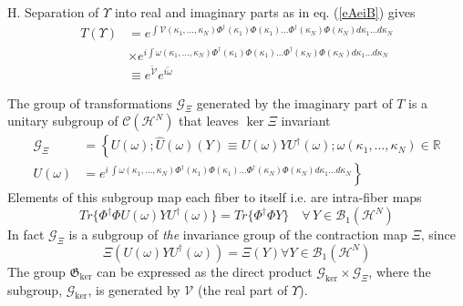 \documentclass[aps,preprint]{revtex4}%
\begin{document}
H. Separation of $\Upsilon$ into real and imaginary parts as in eq.
(\ref{eAeiB}) gives
\begin{align}
T(\Upsilon)  &  =e^{\int\mathcal{V}(\kappa_{1},\ldots,\kappa_{N})\Phi
^{\dagger}(\kappa_{1})\Phi(\kappa_{1})\ldots\Phi^{\dagger}(\kappa_{N}%
)\Phi(\kappa_{N})d\kappa_{1}\ldots d\kappa_{N}}\nonumber\\
&  \times e^{i\int\omega(\kappa_{1},\ldots,\kappa_{N})\Phi^{\dagger}%
(\kappa_{1})\Phi(\kappa_{1})\ldots\Phi^{\dagger}(\kappa_{N})\Phi(\kappa
_{N})d\kappa_{1}\ldots d\kappa_{N}}\nonumber\\
&  \equiv e^{\breve{\mathcal{V}}}e^{i\breve{\omega}} \label{TVomega}%
\end{align}


The group of transformations $\mathcal{G}_{\Xi}$ generated by the imaginary
part of $T$ is a unitary subgroup of $\mathcal{C}(\mathcal{H}^{N})$ that
leaves $\ker\Xi$ invariant
\begin{align}
\!\mathcal{G}_{\Xi}  &  =\left\{  U(\omega);\hat{U}(\omega)(Y)\equiv
U(\omega)YU^{\dagger}(\omega);\right.  \omega(\kappa_{1},\ldots,\kappa_{N}%
)\in\mathbb{R}\nonumber\\
U(\omega)  &  =\left.  e^{i\,\int\omega(\kappa_{1},\ldots,\kappa_{N}%
)\Phi^{\dagger}(\kappa_{1})\Phi(\kappa_{1})\ldots\Phi^{\dagger}(\kappa
_{N})\Phi(\kappa_{N})d\kappa_{1}\ldots d\kappa_{N}}\right\}  \label{GXidefn1}%
\end{align}
Elements of this subgroup map each fiber to itself i.e. are intra-fiber maps
\begin{equation}
Tr\{\Phi^{\dagger}\Phi U(\omega)YU^{\dagger}(\omega)\}=Tr\{\Phi^{\dagger}\Phi
Y\}\quad\forall\,Y\in\mathcal{B}_{1}(\mathcal{H}^{N})
\end{equation}
In fact $\mathcal{G}_{\Xi}$ is a subgroup of \emph{the} invariance group of
the contraction map $\Xi$, since
\begin{equation}
\Xi\left(  U(\omega)YU^{\dagger}(\omega)\right)  =\Xi\left(  Y\right)  \text{
}\forall Y\in\mathcal{B}_{1}\left(  \mathcal{H}^{N}\right)
\end{equation}
The group $\mathfrak{G}_{\ker}$ can be expressed as the direct product
$\mathcal{G}_{\ker}\times\mathcal{G}_{\Xi}$, where the subgroup,
$\mathcal{G}_{\ker}$, is generated by $\mathcal{V}$ (the real part of
$\Upsilon$).
\end{document}
